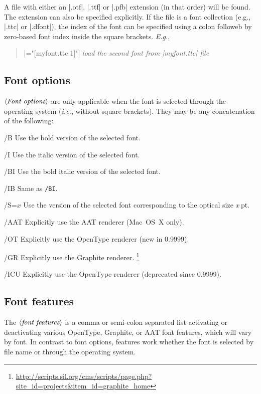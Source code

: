 \documentclass[12pt]{article}
\newenvironment{optdesc}
  {\begin{description}[font=\ttfamily,style=nextline,leftmargin=1.5cm]}
  {\end{description}}
\newcommand\xarg[1]{$\langle\hbox{\rmfamily\itshape #1}\rangle$}
\let\latin\textit
\def\ie{\latin{i.e.}}
\def\Eg{\latin{E.g.}}
\begin{document}
A file with either an |.otf|, |.ttf| or |.pfb| extension (in that order) will be found.  The
extension can also be specified explicitly.
If the file is a font collection (e.g., |.ttc| or |.dfont|), the index of the
font can be specified using a colon followeb by zero-based font index inside
the square brackets. \Eg,
\begin{quote}\small
|\font\4="[myfont.ttc:1]"| \hfill {\em load the second font from |myfont.ttc| file}
\end{quote}


\subsection{Font options}

\xarg{Font options} are only applicable when the font is selected
through the operating system (\ie, without square brackets).  They may
be any concatenation of the following:

\begin{optdesc}
\item[/B] Use the bold version of the selected font.
\item[/I] Use the italic version of the selected font.
\item[/BI] Use the bold italic version of the selected font.
\item[/IB] Same as \texttt{/BI}.
\item[/S=$x$] Use the version of the selected font corresponding to the
optical size $x$\,pt.
\item[/AAT] Explicitly use the AAT renderer (Mac~OS~X only).
\item[/OT] Explicitly use the OpenType renderer (new in 0.9999).
\item[/GR] Explicitly use the Graphite renderer.%
           \footnote{\url{http://scripts.sil.org/cms/scripts/page.php?site_id=projects&item_id=graphite_home}}
\item[/ICU] Explicitly use the OpenType renderer (deprecated since 0.9999).
\end{optdesc}


\subsection{Font features}

The \xarg{font features} is a comma or semi-colon separated list
activating or deactivating various OpenType, Graphite, or AAT font
features, which will vary by font.  In contrast to font options,
features work whether the font is selected by file name or through the
operating system.
\end{document}
